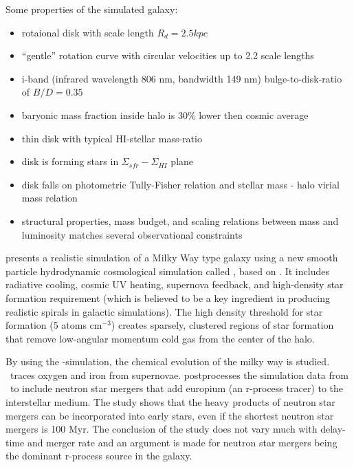 Some properties of the simulated galaxy:
\begin{itemize}
\item{rotaional disk with scale length $R_d=2.5kpc$}
\item{``gentle'' rotation curve with circular velocities up to 2.2
  scale lengths}
\item{i-band (infrared wavelength 806 nm, bandwidth 149 nm)
  bulge-to-disk-ratio of $B/D=0.35$}
\item{baryonic mass fraction inside halo is 30\% lower then
  cosmic average}
\item{thin disk with typical HI-stellar mass-ratio}
\item{disk is forming stars in $\Sigma_{sfr}-\Sigma_{HI}$ plane}
\item{disk falls on photometric Tully-Fisher relation and
  stellar mass - halo virial mass relation}
\item{structural properties, mass budget, and scaling relations between mass and luminosity matches several observational constraints}
\end{itemize}

 presents a realistic simulation of a Milky Way type galaxy using a new smooth particle hydrodynamic cosmological simulation called \eris, based on \gasoline{}. It includes radiative cooling, cosmic UV heating, supernova feedback, and high-density star formation requirement (which is believed to be a key ingredient in producing realistic spirals in galactic simulations).
The high density threshold for star formation (5 atoms cm$^{-3}$) creates sparsely, clustered regions of star formation that remove low-angular momentum cold gas from the center of the halo. 


By using the \eris-simulation, the chemical evolution of the milky way is studied.
\eris\ traces oxygen and iron from supernovae.
 postprocesses the simulation data from \eris\ to include neutron star mergers that add europium (an r-process tracer) to the interstellar medium.
The study shows that the heavy products of neutron star mergers can be incorporated into early stars, even if the shortest neutron star mergers is 100 Myr. The conclusion of the study does not vary much with delay-time and merger rate and an argument is made for neutron star mergers being the dominant r-process source in the galaxy.

